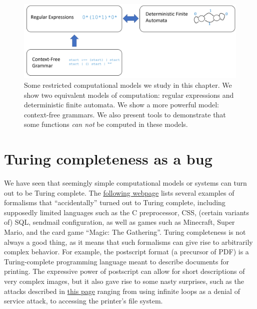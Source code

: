 \begin{figure}
\centering
\includegraphics[width=\textwidth, height=0.25\paperheight, keepaspectratio]{../figure/restrictedoverview.png}
\caption{Some restricted computational models we study in this chapter.
We show two equivalent models of computation: regular expressions and
deterministic finite automata. We show a more powerful model:
context-free grammars. We also present tools to demonstrate that some
functions \emph{can not} be computed in these models.}
\label{restrictedmodelsoverviewfig}
\end{figure}

\section{Turing completeness as a bug}\label{Turing-completeness-as-a-}

We have seen that seemingly simple computational models or systems can
turn out to be Turing complete. The
\href{https://goo.gl/xRXq7p}{following webpage} lists several examples
of formalisms that ``accidentally'' turned out to Turing complete,
including supposedly limited languages such as the C preprocessor, CSS,
(certain variants of) SQL, sendmail configuration, as well as games such
as Minecraft, Super Mario, and the card game ``Magic: The Gathering''.
Turing completeness is not always a good thing, as it means that such
formalisms can give rise to arbitrarily complex behavior. For example,
the postscript format (a precursor of PDF) is a Turing-complete
programming language meant to describe documents for printing. The
expressive power of postscript can allow for short descriptions of very
complex images, but it also gave rise to some nasty surprises, such as
the attacks described in
\href{http://hacking-printers.net/wiki/index.php/PostScript}{this page}
ranging from using infinite loops as a denial of service attack, to
accessing the printer's file system.

